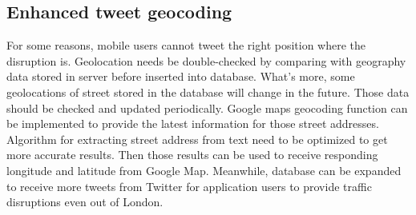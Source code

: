 \subsection{Enhanced tweet geocoding}
For some reasons, mobile users cannot tweet the right position where the disruption is. Geolocation needs be double-checked by comparing with geography data stored in server before inserted into database. What's more, some geolocations of street stored in the database will change in the future. Those data should be checked and updated periodically. Google maps geocoding function can be implemented to provide the latest information for those street addresses. Algorithm for extracting street address from text need to be optimized to get more accurate results. Then those results can be used to receive responding longitude and latitude from Google Map. Meanwhile, database can be expanded to receive more tweets from Twitter for application users to provide traffic disruptions even out of London.
